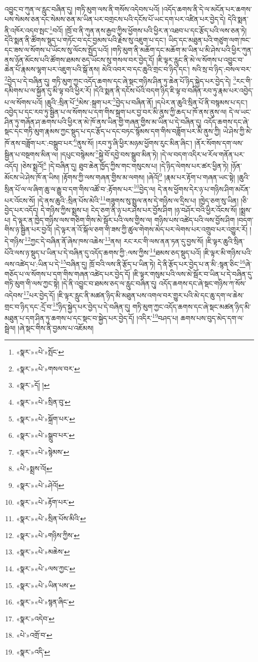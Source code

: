 འབྱུང་བ་ཀུན་ལ་རླུང་བཞིན་དུ། །གཏི་མུག་ལས་ནི་གསོས་འདེབས་པའོ། །འདོད་ཆགས་ནི་དེ་ལ་མངོན་པར་ཆགས་པས་སེམས་ཅན་དང་སེམས་ཅན་མ་ཡིན་པར་བགྲངས་པའི་དངོས་པོ་ཡང་དག་པར་འཛིན་པར་བྱེད་དེ། དེའི་སྨན་ནི་འཁོར་འདབ་སྤང་\footnote{«སྣར་»«པེ་»སྤོང་}བའོ། །ཁྲོ་བ་ནི་ཀུན་ནས་རྒྱབ་ཀྱིས་ཕྱོགས་པའི་ཕྱིར་ན་འཐབ་པ་དང་རྩོད་པའི་ལས་ཅན་ཏེ། དེའི་སྨན་ནི་ཚོགས་སྡུད་པ་གཏོང་བ་དང་བྱམས་པའི་རྗེས་སུ་འཇུག་པ་དང་། ཡིད་དང་མཐུན་པའི་གཙུག་ལག་ཁང་དང་ཟས་ལ་སོགས་པ་ཡོངས་སུ་ལོངས་སྤྱོད་པའོ། །གཏི་མུག་ནི་མཆོག་དང་མཆོག་མ་ཡིན་པ་མི་ཤེས་པའི་ཕྱིར་ཀུན་ནས་ཉོན་མོངས་པའི་ཚོགས་ཐམས་ཅད་ཡོངས་སུ་གསལ་བར་བྱེད་དོ། །ཇི་ལྟར་རླུང་ནི་མེ་ལ་སོགས་པ་འབྱུང་བ་ཆེན་པོ་རྣམས་ལྷག་པར་འཇུག་པའི་སྒོ་ནས། མེའི་འབར་བ་དང་ཆུའི་གྲང་བ་ཉིད་དང་། སའི་སྲ་བ་ཉིད་:བསལ་བར་\footnote{«སྣར་»«པེ་»གསལ་བར་}བྱེད་པ་དེ་བཞིན་དུ། གཏི་མུག་ཀྱང་འདོད་ཆགས་དང་ཞེ་སྡང་གཉིས་ཤིན་ཏུ་ཆེན་པོ་ཉིད་སྐྱེད་པར་བྱེད་དེ། \footnote{«སྣར་»དོ། ། }རང་གི་དམིགས་པ་ལ་སྐྱོན་དུ་མི་ལྟ་བའི་ཕྱིར་རོ། །དེའི་སྨན་ནི་དངོས་པོའི་བདག་ཉིད་ཇི་ལྟ་བ་བཞིན་རབ་ཏུ་རྣམ་པར་འབྱེད་པ་ལ་སོགས་པའོ། །ཆུའི་:སྲིན་པོ་\footnote{«སྣར་»«པེ་»སྲིན་བུ་}མེས་:སྐྲག་པར་\footnote{«སྣར་»«པེ་»སྐྲོག་པར་}བྱེད་པ་བཞིན་ནོ། །དཔེར་ན་ཆུའི་སྲིན་པོ་ནི་བསྙམས་པ་དང་། འབྱེད་པ་དང་རབ་ཏུ་སྦྱིན་པ་ལ་སོགས་པ་དག་གིས་སྐྲག་པར་བྱ་བར་མི་ནུས་ཀྱི་ཆད་པ་ཁོ་ནས་ནུས་ལ། དེ་ལ་ཡང་ཤིན་ཏུ་གཞོན་ཤ་ཆགས་པའི་ཕྱིར་ན་མེ་ཁོ་ནས་ཡིན་གྱི་གཞན་གྱིས་མ་ཡིན་པ་དེ་བཞིན་དུ། འདོད་ཆགས་དང་ཞེ་སྡང་དང་གཏི་མུག་རྣམས་ཀྱང་སྡུད་པ་དང་རྩོད་པ་དང་བཏང་སྙོམས་དག་གིས་བཟློག་པར་མི་ནུས་ཀྱི། ཡེ་ཤེས་ཀྱི་མེ་ཁོ་ནས་བཟློག་པར་:བསྒྲུབ་པར་\footnote{«སྣར་»«པེ་»སྒྲུབ་པར་}ནུས་སོ། །རབ་ཏུ་ཞི་ཕྱིར་མཉམ་ཕྱོགས་རུང་མིན་ཞིང་། །ནོར་སོགས་དག་ལས་སྦྱིན་པ་བསྔགས་མིན་ལ། །དཔུང་བསྙེམས་\footnote{«སྣར་»«པེ་»སྙེམས་}སྐྱེ་བོ་དབྱེ་བས་སྒྲུབ་མིན་ཏེ། །དེ་ལ་བདག་འདིར་ཕ་རོལ་གནོན་པར་འདོད། །ཅེས་སྨྲའོ།\footnote{«པེ་»སྨྲས་འོ།} །དེ་བཞིན་དུ། ཐུབ་ཆེན་ཁྱོད་ཀྱིས་གང་གསུངས་པ། །དེ་ཉིད་ལེགས་པར་ཚར་ཕྱིན་ཏེ། །ཉོན་མོངས་ཡེ་ཤེས་ཁོ་ན་ཡིས། །རྟོགས་ཀྱི་ལས་གཞན་གྱིས་མ་ལགས། །ཞེའོ།\footnote{«སྣར་»«པེ་»ཤེའོ།} །རྣམ་པར་རྟོག་པ་གཞན་ཡང་སྟེ། །ཆུའི་སྲིན་པོ་ལ་ལ་ཞིག་ཆུ་ལ་རྒྱུ་བ་དག་གིས་འཚོ་བ་:རྟོགས་པར་\footnote{«སྣར་»«པེ་»རྟོག་པར་}བྱེད་ལ། དེ་ནས་ཕྱོགས་དེར་ཉ་པ་གཉིས་ཤིག་མངོན་པར་འོངས་སོ། །དེ་ནས་ཆུའི་:སྲིན་པོས་མེའི་\footnote{«སྣར་»«པེ་»སྲིན་པོས་མིའི་}གཟུགས་སུ་སྤྲུལ་ནས་དེ་གཉིས་ལ་དྲིས་པ། །ཁྱེད་ཅག་སུ་ཡིན། །ཅི་བྱེད་པར་འདོད། དེ་གཉིས་ཀྱིས་སྨྲས་པ། ངེད་ཅག་ནི་ཉ་པར་ཤེས་པར་བྱོས་ཤིག །ཉ་བཤོར་བའི་ཕྱིར་འོངས་སོ། །སྨྲས་པ། དེ་ལྟར་ན་ཁྱེད་གཉིས་ལས་གཅིག་གིས་མེ་སྦོར་པའི་ལས་གྱིས་ལ། གཉིས་པས་འཚེད་པའི་ལས་བྱོས་ཤིག །བདག་གིས་ཉ་སྦྱིན་པར་བྱའོ། །དེ་ལྟར་ན་འོ་སྐོལ་ཅག་གི་ཟས་ཀྱི་ཚུལ་གེགས་མེད་པར་ལེགས་པར་འགྲུབ་པར་འགྱུར་རོ། །དེ་གཉིས་\footnote{«སྣར་»«པེ་»གཉིས་ཀྱིས་}ཀྱང་དེ་བཞིན་ནོ་ཞེས་ཁས་འཆེས་\footnote{«སྣར་»«པེ་»མཆེས་}ནས། རང་རང་གི་ལས་ནན་ཏན་དུ་བྱས་སོ། །ཇི་ལྟར་ཆུའི་སྲིན་པོའི་ལས་ཉ་སྡུད་པ་ཡིན་པ་དེ་བཞིན་དུ་འདོད་ཆགས་ཀྱི་:ལས་ཀྱིས་\footnote{«སྣར་»«པེ་»ལས་ཀྱང་}ཐམས་ཅད་སྡུད་པའོ། །ཇི་ལྟར་མི་གཉིས་པའི་ལས་འཚེད་པ་:ཡིན་པ་དེ་\footnote{«སྣར་»«པེ་»ཡིན་པས་}བཞིན་དུ། ཁྲོ་བའི་ལས་ནི་རྩོད་པ་ཡིན་ཏེ། དེ་ནི་རྩོད་པར་བྱེད་པ་ན་མི་:སྙན་ཅིང་\footnote{«སྣར་»«པེ་»སྙན་ཞིང་}ཞེ་གཅོད་པ་ལ་སོགས་པ་དག་གིས་གཞན་འཚེད་པར་བྱེད་དོ། །ཇི་ལྟར་གསུམ་པའི་ལས་མེ་སྦོར་བ་ཡིན་པ་དེ་བཞིན་དུ་གཏི་མུག་གི་ལས་ཀྱང་སྟེ། །དེ་ནི་འབྱུང་བ་ཐམས་ཅད་ལ་རླུང་བཞིན་དུ། འདོད་ཆགས་དང་ཞེ་སྡང་གཉིས་ཀ་སོས་འདེབས་\footnote{«སྣར་»འདེབ་}པར་བྱེད་དོ། །ཇི་ལྟར་རླུང་ནི་མཚན་ཉིད་མི་མཐུན་པས་འགལ་བར་གྱུར་པའི་མེ་དང་ཆུ་དག་ལ་ཆེས་གྲང་བ་ཉིད་དང་:དྲོ་བ་\footnote{«པེ་»འགྲོ་བ་}ཉིད་སྐྱེད་པར་བྱེད་པ་དེ་བཞིན་དུ། གཏི་མུག་ཀྱང་འདོད་ཆགས་དང་ཞེ་སྡང་མཚན་ཉིད་མི་མཐུན་པ་དག་ཤིན་ཏུ་ཆགས་པ་དང་སྡང་བ་སྐྱེད་པར་བྱེད་དོ། །འདིར་\footnote{«སྣར་»འདི་}བཤད་པ། ཆགས་པས་བུད་མེད་དག་ལ་སྦྲེལ། །ཞེ་སྡང་གིས་ནི་བྱམས་པ་འཇོམས། 